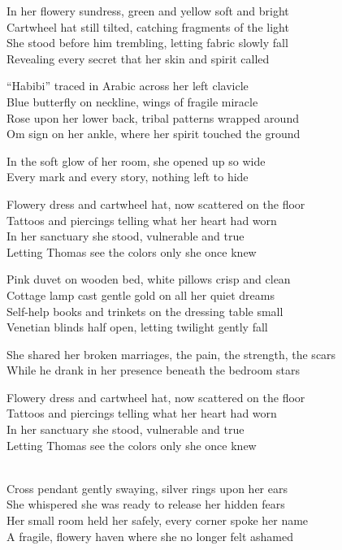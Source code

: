 \begin{lyrics}

In her flowery sundress, green and yellow soft and bright\\
Cartwheel hat still tilted, catching fragments of the light\\
She stood before him trembling, letting fabric slowly fall\\
Revealing every secret that her skin and spirit called

“Habibi” traced in Arabic across her left clavicle\\
Blue butterfly on neckline, wings of fragile miracle\\
Rose upon her lower back, tribal patterns wrapped around\\
Om sign on her ankle, where her spirit touched the ground

In the soft glow of her room, she opened up so wide\\
Every mark and every story, nothing left to hide

Flowery dress and cartwheel hat, now scattered on the floor\\
Tattoos and piercings telling what her heart had worn\\
In her sanctuary she stood, vulnerable and true\\
Letting Thomas see the colors only she once knew

Pink duvet on wooden bed, white pillows crisp and clean\\
Cottage lamp cast gentle gold on all her quiet dreams\\
Self-help books and trinkets on the dressing table small\\
Venetian blinds half open, letting twilight gently fall

She shared her broken marriages, the pain, the strength, the scars\\
While he drank in her presence beneath the bedroom stars

Flowery dress and cartwheel hat, now scattered on the floor\\
Tattoos and piercings telling what her heart had worn\\
In her sanctuary she stood, vulnerable and true\\
Letting Thomas see the colors only she once knew

\\
Cross pendant gently swaying, silver rings upon her ears\\
She whispered she was ready to release her hidden fears\\
Her small room held her safely, every corner spoke her name\\
A fragile, flowery haven where she no longer felt ashamed


\end{lyrics}
